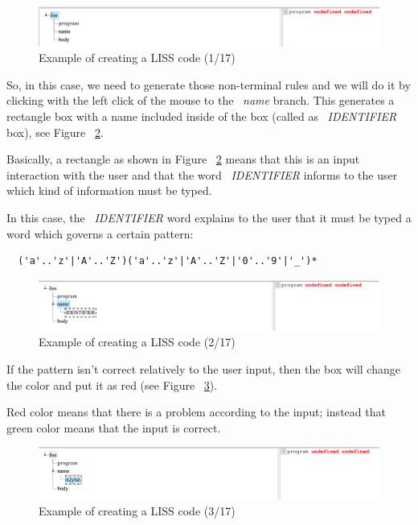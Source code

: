 \documentclass[
  oneside,
  11pt, a4paper,
  footinclude=true,
  headinclude=true,
  cleardoublepage=empty
]{scrbook}
\begin{document}
\begin{figure}[h!]
  \centering
    \includegraphics[width=1\textwidth]{img/LISS-SDE_creating_program/LISS-SDE1.png}
    \caption{Example of creating a LISS code (1/17)}
    \label{fig:LISS-SDE_example_1}
\end{figure}

So, in this case, we need to generate those non-terminal rules and we will do it by clicking with the left click of the mouse to the ~\textit{name} branch.
This generates a rectangle box with a name included inside of the box (called as ~\textit{IDENTIFIER} box), see Figure ~\ref{fig:LISS-SDE_example_2}.

Basically, a rectangle as shown in Figure ~\ref{fig:LISS-SDE_example_2} means that this is an input interaction with the user and that the word ~\textit{IDENTIFIER} informs to the user which kind of information must be typed.

In this case, the ~\textit{IDENTIFIER} word explains to the user that it must be typed a word which governs a certain pattern:

\begin{lstlisting}
  ('a'..'z'|'A'..'Z')('a'..'z'|'A'..'Z'|'0'..'9'|'_')*
\end{lstlisting}

\begin{figure}[h!]
  \centering
    \includegraphics[width=1\textwidth]{img/LISS-SDE_creating_program/LISS-SDE2.png}
    \caption{Example of creating a LISS code (2/17)}
    \label{fig:LISS-SDE_example_2}
\end{figure}

If the pattern isn't correct relatively to the user input, then the box will change the color and put it as red (see Figure ~\ref{fig:LISS-SDE_example_3}).

Red color means that there is a problem according to the input; instead that green color means that the input is correct.

\begin{figure}[h!]
  \centering
    \includegraphics[width=1\textwidth]{img/LISS-SDE_creating_program/LISS-SDE3.png}
    \caption{Example of creating a LISS code (3/17)}
    \label{fig:LISS-SDE_example_3}
\end{figure}
\end{document}
